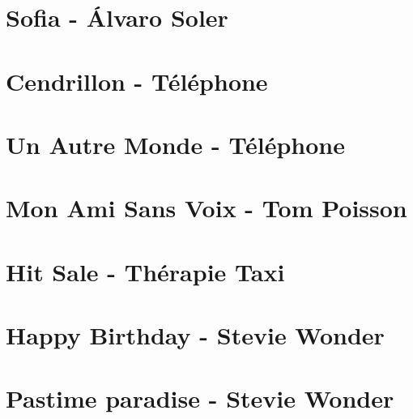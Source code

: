 \documentclass{guitartabs}
\begin{document}
\section{Sofia - Álvaro Soler}
\begin{guitar}

\end{guitar}

\section*{Cendrillon - Téléphone}
\begin{guitar}

\end{guitar}

\section*{Un Autre Monde - Téléphone}
\begin{guitar}

\end{guitar}


\section*{Mon Ami Sans Voix - Tom Poisson}
\begin{guitar}

\end{guitar}

\section{Hit Sale - Thérapie Taxi}
\begin{guitar}

\end{guitar}

\section{Happy Birthday - Stevie Wonder}
\begin{guitar}

\end{guitar}



\section{Pastime paradise - Stevie Wonder}
\begin{guitar}

\end{guitar}
\end{document}

